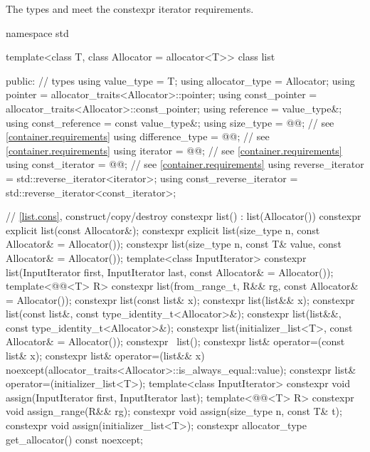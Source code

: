 \pnum
The types  and  meet
the constexpr iterator requirements.

\begin{codeblock}
namespace std {
  template<class T, class Allocator = allocator<T>>
  class list {
  public:
    // types
    using value_type             = T;
    using allocator_type         = Allocator;
    using pointer                = allocator_traits<Allocator>::pointer;
    using const_pointer          = allocator_traits<Allocator>::const_pointer;
    using reference              = value_type&;
    using const_reference        = const value_type&;
    using size_type              = @@; // see \ref{container.requirements}
    using difference_type        = @@; // see \ref{container.requirements}
    using iterator               = @@; // see \ref{container.requirements}
    using const_iterator         = @@; // see \ref{container.requirements}
    using reverse_iterator       = std::reverse_iterator<iterator>;
    using const_reverse_iterator = std::reverse_iterator<const_iterator>;

    // \ref{list.cons}, construct/copy/destroy
    constexpr list() : list(Allocator()) { }
    constexpr explicit list(const Allocator&);
    constexpr explicit list(size_type n, const Allocator& = Allocator());
    constexpr list(size_type n, const T& value, const Allocator& = Allocator());
    template<class InputIterator>
      constexpr list(InputIterator first, InputIterator last, const Allocator& = Allocator());
    template<@@<T> R>
      constexpr list(from_range_t, R&& rg, const Allocator& = Allocator());
    constexpr list(const list& x);
    constexpr list(list&& x);
    constexpr list(const list&, const type_identity_t<Allocator>&);
    constexpr list(list&&, const type_identity_t<Allocator>&);
    constexpr list(initializer_list<T>, const Allocator& = Allocator());
    constexpr ~list();
    constexpr list& operator=(const list& x);
    constexpr list& operator=(list&& x)
      noexcept(allocator_traits<Allocator>::is_always_equal::value);
    constexpr list& operator=(initializer_list<T>);
    template<class InputIterator>
      constexpr void assign(InputIterator first, InputIterator last);
    template<@@<T> R>
      constexpr void assign_range(R&& rg);
    constexpr void assign(size_type n, const T& t);
    constexpr void assign(initializer_list<T>);
    constexpr allocator_type get_allocator() const noexcept;

}}
\end{codeblock}
